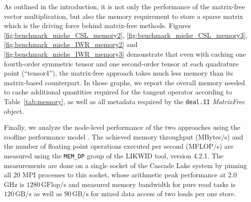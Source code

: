 \documentclass[AMA,STIX1COL]{WileyNJD-v2}
\begin{document}
As outlined in the introduction, it is not only the performance of the matrix-free vector multiplication, but also the memory requirement to store a sparse matrix which is the driving force behind matrix-free methods.
Figures \ref{fig:benchmark_miehe_CSL_memory2}, \ref{fig:benchmark_miehe_CSL_memory3}, \ref{fig:benchmark_miehe_IWR_memory2} and \ref{fig:benchmark_miehe_IWR_memory3} demonstrate that even with caching one fourth-order symmetric tensor and one second-order tensor at each quadrature point (``tensor4''), the matrix-free approach takes much less memory than its matrix-based counterpart.
{\color{red}
In those graphs, we report the overall memory needed to cache additional quantities required for the tangent operator according to Table~\ref{tab:memory}, as well as all metadata required by
the \texttt{deal.II} \textit{MatrixFree} object.
}

Finally, we analyze the node-level performance of the two approaches using the roofline performance model \cite{Williams2009}.
The achieved memory throughput (MBytes/s) and the number of floating point operations executed per second (MFLOP/s) are measured using the \texttt{MEM\_DP} group of the LIKWID \cite{likwid} tool, version 4.2.1.
The measurements are done on a single socket of the Cascade Lake system by pinning all 20 MPI processes to this socket, whose arithmetic peak performance at 2.0 GHz is $1280\, \text{GFlop/s}$ and measured memory bandwidth for pure read tasks is $120\, \text{GB/s}$ as well as $90\, \text{GB/s}$ for mixed data access of two loads per one store.
\end{document}

